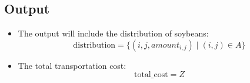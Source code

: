 \documentclass{article}
\begin{document}
\subsection*{Output}
\begin{itemize}
    \item The output will include the distribution of soybeans:
    \[
    \text{distribution} = \{ (i, j, amount_{i,j}) \mid (i,j) \in A \}
    \]
    \item The total transportation cost:
    \[
    \text{total\_cost} = Z
    \]
\end{itemize}
\end{document}
